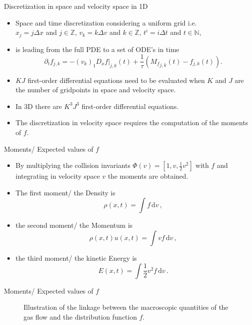 \documentclass[Nike]{tuberlinbeamer}
\begin{document}
\begin{frame}[fragile]{Discretization in space and velocity space in 1D}
	\begin{itemize}
		\item Space and time discretization considering a uniform grid i.e.\\ $x_j = j\Delta x$ and $j\in \mathbb{Z}$, $v_k = k\Delta v$ and $k\in \mathbb{Z}$, $t^i=i\Delta t$ and $t\in \mathbb{N}$,
		\item is leading from the full PDE to a set of ODE's in time 
			\begin{equation}
			\partial_t f_{j,k} = -(v_k)_1D_x f|_{j,k}(t) + \frac{1}{\tau}({M_f}_{j,k}(t) - f_{j,k}(t))\mathrm{.}
			\end{equation}
		\item $KJ$ first-order differential equations need to be evaluated when $K$ and $J$ are the number of gridpoints in space and velocity space.
		\item In 3D there are $K^3J^3$ first-order differential equations.
		\item The discretization in velocity space requires the computation of the moments of $f$.
	\end{itemize}
\end{frame}

\begin{frame}[fragile]{Moments/ Expected values of $f$}
	\begin{itemize}
		\item By multiplying the collision invariants $\Phi(v)=[1,v,\frac{1}{2}v^2]$ with $f$ and integrating in velocity space $v$ the moments are obtained.
		\item The first moment/ the Density is
		\begin{equation}
				\rho(x,t) = \int\! f \,\mathrm{d}v \,,
		\end{equation}
		\item the second moment/ the Momentum is
		\begin{equation}
			\rho(x,t) u(x,t) = \int\! v f \,\mathrm{d}v \,,
		\end{equation}
		\item the third moment/ the kinetic Energy is
		\begin{equation}
			E(x,t) = \int\! \frac{1}{2}v^2 f  \,\mathrm{d}v \,.
		\end{equation}
	\end{itemize}
\end{frame}

\begin{frame}[fragile]{Moments/ Expected values of $f$}
	\begin{center}
		\begin{figure}
			
			\caption{Illustration of the linkage between the macroscopic quantities of the gas flow and the distribution function \(f\).}
		\end{figure}
	\end{center}
\end{frame}
\end{document}
